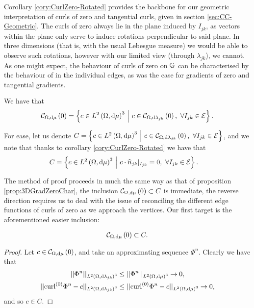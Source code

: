 Corollary \ref{cory:CurlZero-Rotated} provides the backbone for our geometric interpretation of curls of zero and tangential curls, given in section \ref{sec:CC-Geometric}.
The curls of zero always lie in the plane induced by $I_{jk}$, as vectors within the plane only serve to induce rotations perpendicular to said plane.
In three dimensions (that is, with the usual Lebesgue measure) we would be able to observe such rotations, however with our limited view (through $\lambda_{jk}$), we cannot.
As one might expect, the behaviour of curls of zero on $\mathbb{G}$ can be characterised by the behaviour of in the individual edges, as was the case for gradients of zero and tangential gradients.
\begin{theorem} \label{thm:CurlZeroChar}
	We have that
	\begin{align*}
		\mathcal{C}_{ \Omega, \mathrm{d}\mu}\left( 0 \right) = \left\{  c\in L^{2}\left( \Omega,\mathrm{d} \mu \right)^3 \ \middle\vert \  c\in\mathcal{C}_{ \Omega, \mathrm{d}\lambda_{jk}}\left( 0 \right), \ \forall I_{jk}\in\mathcal{E}  \right\}.
	\end{align*}
\end{theorem}
For ease, let us denote $C = \left\{  c\in L^{2}\left( \Omega,\mathrm{d} \mu \right)^3 \ \middle\vert \  c\in\mathcal{C}_{ \Omega, \mathrm{d}\lambda_{jk}}\left( 0 \right), \ \forall I_{jk}\in\mathcal{E}  \right\}$, and we note that thanks to corollary \ref{cory:CurlZero-Rotated} we have that
\begin{align*}
	C &= \left\{  c\in L^{2}\left( \Omega,\mathrm{d} \mu \right)^3 \ \middle\vert \  c\cdot\widehat{n}_{jk}\vert_{I_{jk}}=0, \ \forall I_{jk}\in\mathcal{E}  \right\}.
\end{align*}

The method of proof proceeds in much the same way as that of proposition \ref{prop:3DGradZeroChar}, the inclusion $\mathcal{C}_{ \Omega, \mathrm{d}\mu}\left( 0 \right)\subset C$ is immediate, the reverse direction requires us to deal with the issue of reconciling the different edge functions of curls of zero as we approach the vertices.
Our first target is the aforementioned easier inclusion:
\begin{lemma} \label{lem:CurlZeroInC}
	\begin{align*}
		\mathcal{C}_{ \Omega, \mathrm{d}\mu}\left( 0 \right) \subset C.
	\end{align*}
\end{lemma}
\begin{proof}
	Let $c\in\mathcal{C}_{ \Omega, \mathrm{d}\mu}\left( 0 \right)$, and take an approximating sequence $\Phi^n$.
	Clearly we have that
	\begin{align*}
		\lvert\lvert  \Phi^n  \rvert\rvert_{L^{2}\left( \Omega,\mathrm{d} \lambda_{jk} \right)^3} &\leq \lvert\lvert  \Phi^n  \rvert\rvert_{L^{2}\left( \Omega,\mathrm{d} \mu \right)^3} \rightarrow 0, \\
		\lvert\lvert  \mathrm{curl}_{}^{(0)}\Phi^n - c  \rvert\rvert_{L^{2}\left( \Omega,\mathrm{d} \lambda_{jk} \right)^3} & \leq \lvert\lvert  \mathrm{curl}_{}^{(0)}\Phi^n - c  \rvert\rvert_{L^{2}\left( \Omega,\mathrm{d} \mu \right)^3} \rightarrow 0,
	\end{align*}
	and so $c\in C$.
\end{proof}

